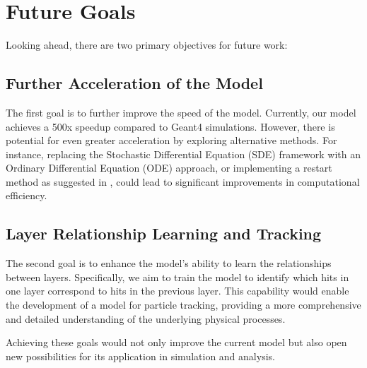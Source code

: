 \chapter{Future Goals}

Looking ahead, there are two primary objectives for future work:

\section{Further Acceleration of the Model}
The first goal is to further improve the speed of the model. Currently, our model achieves a 500x speedup compared to Geant4 simulations. However, there is potential for even greater acceleration by exploring alternative methods. For instance, replacing the Stochastic Differential Equation (SDE) framework with an Ordinary Differential Equation (ODE) approach, or implementing a restart method as suggested in \cite{restart}, could lead to significant improvements in computational efficiency.

\section{Layer Relationship Learning and Tracking}
The second goal is to enhance the model's ability to learn the relationships between layers. Specifically, we aim to train the model to identify which hits in one layer correspond to hits in the previous layer. This capability would enable the development of a model for particle tracking, providing a more comprehensive and detailed understanding of the underlying physical processes.

Achieving these goals would not only improve the current model but also open new possibilities for its application in simulation and analysis.

